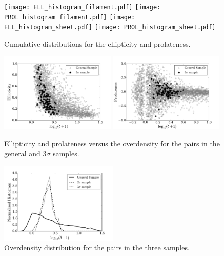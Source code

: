 \documentclass{emulateapj}
\begin{document}
\begin{figure}
\begin{center}
  \texttt{[image: ELL\_histogram\_filament.pdf]}
  \texttt{[image: PROL\_histogram\_filament.pdf]}
  \texttt{[image: ELL\_histogram\_sheet.pdf]}
  \texttt{[image: PROL\_histogram\_sheet.pdf]}
\end{center}
\caption{Cumulative distributions for the ellipticity and prolateness.
    \label{fig:ELL_PROL}}  
\end{figure}



\begin{figure}
\begin{center}
  \includegraphics[width=0.49\textwidth]{ELL_delta_scatter.pdf}
  \includegraphics[width=0.49\textwidth]{PROL_delta_scatter.pdf}
\end{center}
\caption{Ellipticity and prolateness versus the overdensity for the pairs
in the general and $3\sigma$ samples. \label{fig:delta_ELL_PROL}} 
\end{figure}


\begin{figure}
\begin{center}
  \includegraphics[width=0.50\textwidth]{density_histogram.pdf}
\end{center}
\caption{Overdensity distribution for the pairs in the three samples.
    \label{fig:density}}  
\end{figure}
\end{document}
